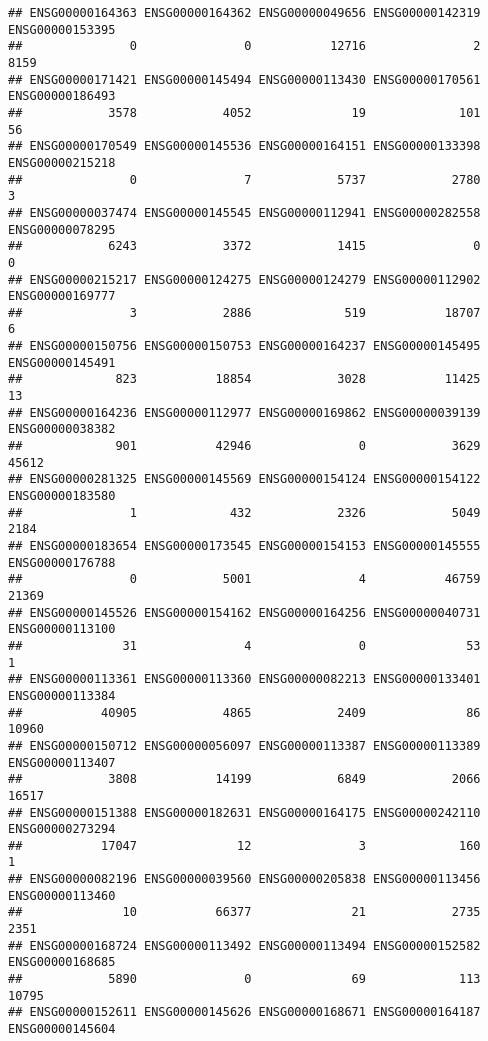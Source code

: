 \documentclass[
]{article}
\begin{document}
\begin{verbatim}
## ENSG00000164363 ENSG00000164362 ENSG00000049656 ENSG00000142319 ENSG00000153395 
##               0               0           12716               2            8159 
## ENSG00000171421 ENSG00000145494 ENSG00000113430 ENSG00000170561 ENSG00000186493 
##            3578            4052              19             101              56 
## ENSG00000170549 ENSG00000145536 ENSG00000164151 ENSG00000133398 ENSG00000215218 
##               0               7            5737            2780               3 
## ENSG00000037474 ENSG00000145545 ENSG00000112941 ENSG00000282558 ENSG00000078295 
##            6243            3372            1415               0               0 
## ENSG00000215217 ENSG00000124275 ENSG00000124279 ENSG00000112902 ENSG00000169777 
##               3            2886             519           18707               6 
## ENSG00000150756 ENSG00000150753 ENSG00000164237 ENSG00000145495 ENSG00000145491 
##             823           18854            3028           11425              13 
## ENSG00000164236 ENSG00000112977 ENSG00000169862 ENSG00000039139 ENSG00000038382 
##             901           42946               0            3629           45612 
## ENSG00000281325 ENSG00000145569 ENSG00000154124 ENSG00000154122 ENSG00000183580 
##               1             432            2326            5049            2184 
## ENSG00000183654 ENSG00000173545 ENSG00000154153 ENSG00000145555 ENSG00000176788 
##               0            5001               4           46759           21369 
## ENSG00000145526 ENSG00000154162 ENSG00000164256 ENSG00000040731 ENSG00000113100 
##              31               4               0              53               1 
## ENSG00000113361 ENSG00000113360 ENSG00000082213 ENSG00000133401 ENSG00000113384 
##           40905            4865            2409              86           10960 
## ENSG00000150712 ENSG00000056097 ENSG00000113387 ENSG00000113389 ENSG00000113407 
##            3808           14199            6849            2066           16517 
## ENSG00000151388 ENSG00000182631 ENSG00000164175 ENSG00000242110 ENSG00000273294 
##           17047              12               3             160               1 
## ENSG00000082196 ENSG00000039560 ENSG00000205838 ENSG00000113456 ENSG00000113460 
##              10           66377              21            2735            2351 
## ENSG00000168724 ENSG00000113492 ENSG00000113494 ENSG00000152582 ENSG00000168685 
##            5890               0              69             113           10795 
## ENSG00000152611 ENSG00000145626 ENSG00000168671 ENSG00000164187 ENSG00000145604 

\end{verbatim}
\end{document}
